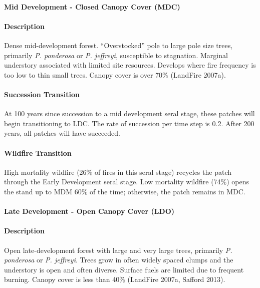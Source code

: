 \noindent\hrulefill

\paragraph{Mid Development - Closed Canopy Cover (MDC)}

\paragraph{Description} Dense mid-development forest. ``Overstocked'' pole to large pole size trees, primarily \emph{P. ponderosa} or \emph{P. jeffreyi}, susceptible to stagnation. Marginal understory associated with limited site resources. Develops where fire frequency is too low to thin small trees. Canopy cover is over 70\% (LandFire 2007a).

\paragraph{Succession Transition} At 100 years since succession to a mid development seral stage, these patches will begin transitioning to LDC. The rate of succession per time step is 0.2. After 200 years, all patches will have succeeded.

\paragraph{Wildfire Transition} High mortality wildfire (26\% of fires in this seral stage) recycles the patch through the Early Development seral stage. Low mortality wildfire (74\%) opens the stand up to MDM 60\% of the time; otherwise, the patch remains in MDC.

\noindent\hrulefill


\paragraph{Late Development - Open Canopy Cover (LDO)}

\paragraph{Description} Open late-development forest with large and very large trees, primarily \emph{P. ponderosa} or \emph{P. jeffreyi}. Trees grow in often widely spaced clumps and the understory is open and often diverse. Surface fuels are limited due to frequent burning. Canopy cover is less than 40\% (LandFire 2007a, Safford 2013).

